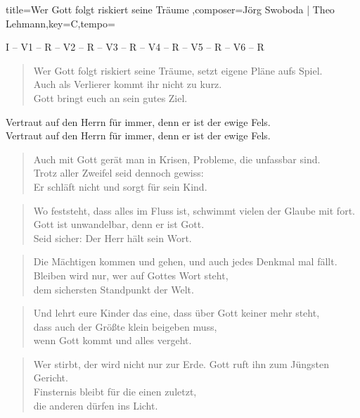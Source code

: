 \documentclass{leadsheet}
\begin{document}
\begin{song}{title={Wer Gott folgt riskiert seine Träume
},composer={Jörg Swoboda | Theo Lehmann},key={C},tempo={}}

\begin{schedule}
I -- V1 -- R -- V2 -- R -- V3 -- R -- V4 -- R -- V5 -- R -- V6 -- R
\end{schedule}

\begin{intro}
\end{intro}

\begin{verse}
Wer Gott folgt riskiert seine Träume, 
setzt eigene Pläne aufs Spiel. \\
Auch als Verlierer kommt ihr nicht zu kurz. \\
Gott bringt euch an sein gutes Ziel.
\end{verse}

\begin{chorus}
Vertraut auf den Herrn für immer,
denn er ist der ewige Fels. \\
Vertraut auf den Herrn für immer,
denn er ist der ewige Fels.
\end{chorus}

\begin{verse}
Auch mit Gott gerät man in Krisen,
Probleme, die unfassbar sind. \\
Trotz aller Zweifel seid dennoch gewiss: \\
Er schläft nicht und sorgt für sein Kind.
\end{verse}

\begin{verse}
Wo feststeht, dass alles im Fluss ist,
schwimmt vielen der Glaube mit fort. \\
Gott ist unwandelbar, denn er ist Gott. \\
Seid sicher: Der Herr hält sein Wort.
\end{verse}

\begin{verse}
Die Mächtigen kommen und gehen,
und auch jedes Denkmal mal fällt. \\
Bleiben wird nur, wer auf Gottes Wort steht, \\
dem sichersten Standpunkt der Welt.
\end{verse}

\begin{verse}
Und lehrt eure Kinder das eine,
dass über Gott keiner mehr steht, \\
dass auch der Größte klein beigeben muss, \\
wenn Gott kommt und alles vergeht.
\end{verse}

\begin{verse}
Wer stirbt, der wird nicht nur zur Erde.
Gott ruft ihn zum Jüngsten Gericht. \\
Finsternis bleibt für die einen zuletzt, \\
die anderen dürfen ins Licht.
\end{verse}

\end{song}
\end{document}
